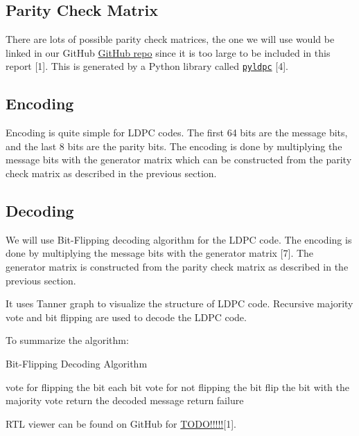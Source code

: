 \documentclass[conference]{IEEEtran}
\begin{document}
\subsection{Parity Check Matrix}
There are lots of possible parity check matrices, the one we will use would be linked in our GitHub \href{https://hichamjanati.github.io/pyldpc/}{GitHub repo} since it is too large to be included in this report [1]. This is generated by a Python library called \href{https://hichamjanati.github.io/pyldpc/}{\texttt{pyldpc}} [4].
\subsection{Encoding}
Encoding is quite simple for LDPC codes. The first 64 bits are the message bits, and the last 8 bits are the parity bits. The encoding is done by multiplying the message bits with the generator matrix which can be constructed from the parity check matrix as described in the previous section.
\subsection{Decoding}
We will use Bit-Flipping decoding algorithm for the LDPC code. The encoding is done by multiplying the message bits with the generator matrix [7]. The generator matrix is constructed from the parity check matrix as described in the previous section.

It uses Tanner graph to visualize the structure of LDPC code. Recursive majority vote and bit flipping are used to decode the LDPC code. 

To summarize the algorithm:
\begin{algorithm}
  \caption{Bit-Flipping Decoding Algorithm}
  \begin{algorithmic}
          \STATE vote for flipping the bit
        \ELSE
        \ENDIF
      \ENDFOR
      \STATE each bit vote for not flipping the bit
      \STATE flip the bit with the majority vote
    \ENDWHILE
    \STATE return the decoded message
    \ELSE
    \STATE return failure
    \ENDIF
  \end{algorithmic}
\end{algorithm}

RTL viewer can be found on GitHub for \href{https://github.com/luckunately/ELEC433-Projects}{TODO!!!!!}[1]. 
\end{document}
